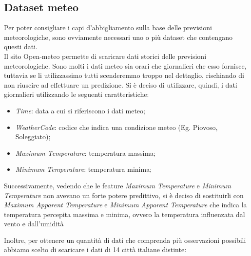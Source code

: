 \documentclass[a4paper, 11pt, oneside]{report}
\begin{document}
                \subsection{Dataset meteo}
                Per poter consigliare i capi d'abbigliamento sulla base delle previsioni meteorologiche, sono ovviamente necessari
                uno o più dataset che contengano questi dati.\\
                Il sito Open-meteo \cite{9} permette di scaricare dati storici delle previsioni meteorologiche.
                Sono molti i dati meteo sia orari che giornalieri che esso fornisce, tuttavia se li utilizzassimo tutti
                scenderemmo troppo nel dettaglio, rischiando di non riuscire ad effettuare un predizione.
                Si è deciso di utilizzare, quindi, i dati giornalieri utilizzando le seguenti caratteristiche:
                \begin{itemize}
                    \item \emph{Time}: data a cui si riferiscono i dati meteo;
                    \item \emph{WeatherCode}: codice che indica una condizione meteo (Eg. Piovoso, Soleggiato);
                    \item \emph{Maximum Temperature}: temperatura massima;
                    \item \emph{Minimum Temperature}: temperatura minima;
                \end{itemize}
                Successivamente, vedendo che le feature \emph{Maximum Temperature} e \emph{Minimum Temperature} non avevano un
                forte potere predittivo, si è deciso di sostituirli con \emph{Maximum Apparent Temperature}
                e \emph{Minimum Apparent Temperature} che indica la temperatura percepita massima e minima,
                ovvero la temperatura influenzata dal vento e dall'umidità
                \\
                \par \noindent Inoltre, per ottenere un quantità di dati che comprenda più osservazioni possibili abbiamo scelto di scaricare i dati di
                14 città italiane distinte:
\end{document}
